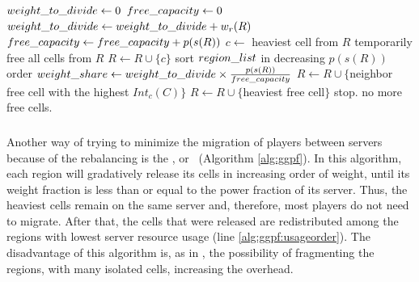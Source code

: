\begin{algorithm}
\caption{\ggpk}
\label{alg:ggpk}
\begin{algorithmic}[1]
	 \STATE $weight\_to\_divide \leftarrow 0$
	 \STATE $free\_capacity \leftarrow 0$
	 		\STATE $weight\_to\_divide \leftarrow weight\_to\_divide + w_r(R)$
	 		\STATE $free\_capacity \leftarrow free\_capacity + p(s(R))$
	 		\STATE $c \leftarrow $ heaviest cell from $R$ \label{alg:ggpk:saveheaviestcell}
	 		\STATE temporarily free all cells from $R$
	 		\STATE $R \leftarrow R \cup \{c\}$ \label{alg:ggpk:getbackheaviestcell}
	 \ENDFOR
	 \STATE sort $region\_list$ in decreasing $p(s(R))$ order \label{alg:ggp:sortregions}
	 		\STATE $weight\_share \leftarrow weight\_to\_divide \times \frac{p(s(R))}{free\_capacity}$
	 		 \label{alg:ggpk:whilefraction}
	 		   		\STATE $R \leftarrow R \cup \{$neighbor free cell with the highest $Int_c(C)$$\}$
	 		   		\STATE $R \leftarrow R \cup \{$heaviest free cell$\}$ \label{alg:ggpk:freeheavycell}
	 		   \ELSE
	 		   		\STATE stop. no more free cells.
	 		   \ENDIF
	 		\ENDWHILE
	 \ENDFOR
\end{algorithmic}
\end{algorithm}

\subsubsection{\ggpf} %
Another way of trying to minimize the migration of players between servers because of the rebalancing is the \textbf{\ggpf}, or \ggpfmeaning\ (Algorithm \ref{alg:ggpf}). In this algorithm, each region will gradatively release its cells in increasing order of weight, until its weight fraction is less than or equal to the power fraction of its server. Thus, the heaviest cells remain on the same server and, therefore, most players do not need to migrate. After that, the cells that were released are redistributed among the regions with lowest server resource usage (line \ref{alg:ggpf:usageorder}). The disadvantage of this algorithm is, as in \ggpk, the possibility of fragmenting the regions, with many isolated cells, increasing the overhead.

